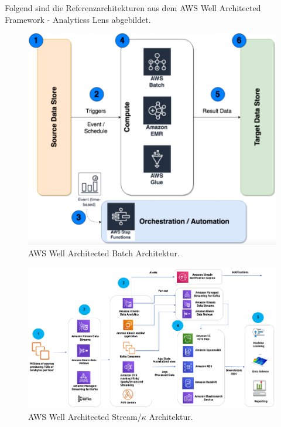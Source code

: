Folgend sind die Referenzarchitekturen aus dem \ac{AWS} Well Architected Framework - Analyticss Lens abgebildet.
\begin{figure}[H]
\centering
\includegraphics[width=\textwidth]{graphics/AWS-Batch-Architecture.pdf}
\caption[AWS Well Architected Batch Architektur]{AWS Well Architected Batch Architektur.\footnotemark}
\label{abb:AWSWellArchitectedBatch}
\end{figure}

\begin{figure}[H]
\centering
\includegraphics[width=0.92\textheight,angle=90,origin=c]{graphics/AWS-Stream-Architecture.pdf}
\caption[AWS Well Architected Stream/$\kappa$ Architektur]{AWS Well Architected Stream/$\kappa$ Architektur.\footnotemark}
\label{abb:AWSWellArchitectedStream}
\end{figure}

